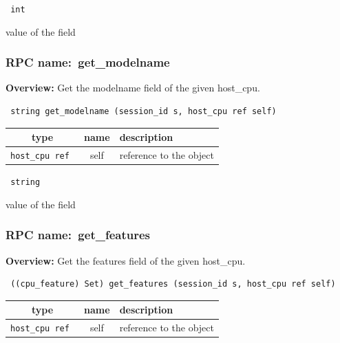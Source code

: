 \vspace{0.3cm}

{\tt 
int
}


value of the field
\vspace{0.3cm}
\vspace{0.3cm}
\vspace{0.3cm}
\subsubsection{RPC name:~get\_modelname}

{\bf Overview:} 
Get the modelname field of the given host\_cpu.

\begin{verbatim} string get_modelname (session_id s, host_cpu ref self)\end{verbatim}



 
\vspace{0.3cm}
\begin{tabular}{|c|c|p{7cm}|}
 \hline
{\bf type} & {\bf name} & {\bf description} \\ \hline
{\tt host\_cpu ref } & self & reference to the object \\ \hline 

\end{tabular}

\vspace{0.3cm}

{\tt 
string
}


value of the field
\vspace{0.3cm}
\vspace{0.3cm}
\vspace{0.3cm}
\subsubsection{RPC name:~get\_features}

{\bf Overview:} 
Get the features field of the given host\_cpu.

\begin{verbatim} ((cpu_feature) Set) get_features (session_id s, host_cpu ref self)\end{verbatim}



 
\vspace{0.3cm}
\begin{tabular}{|c|c|p{7cm}|}
 \hline
{\bf type} & {\bf name} & {\bf description} \\ \hline
{\tt host\_cpu ref } & self & reference to the object \\ \hline 

\end{tabular}

